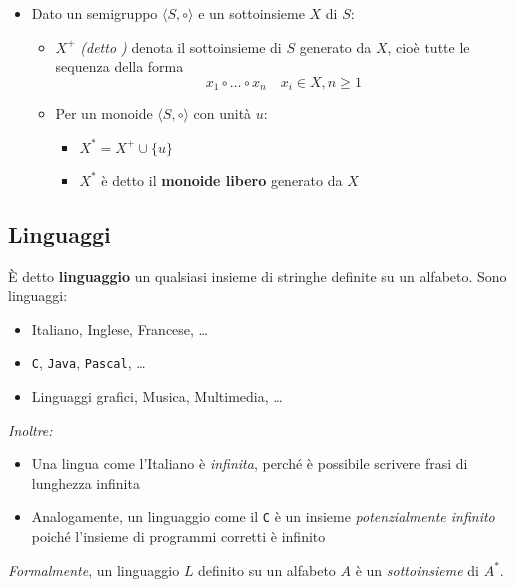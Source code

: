\documentclass[italian, 10pt]{article}
\begin{document}
\begin{itemize}
  \item Dato un semigruppo \(\langle S, \circ \rangle\) e un sottoinsieme \(X\) di \(S\):
        \begin{itemize}
          \item \(X^+\) \textit{(detto )} denota il sottoinsieme di \(S\) generato da \(X\), cioè tutte le sequenza della forma
                \[ x_1 \circ \ldots \circ x_n \quad x_i \in X, n \geq 1 \]
          \item Per un monoide \(\langle S, \circ \rangle\) con unità \(u\):
                \begin{itemize}
                  \item \(X^\ast = X^+ \cup \{u\}\)
                  \item \(X^\ast\) è detto il \textbf{monoide libero} generato da \(X\)
                \end{itemize}

        \end{itemize}
\end{itemize}

\subsection{Linguaggi}

È detto \textbf{linguaggio} un qualsiasi insieme di stringhe definite su un alfabeto.
Sono linguaggi:

\begin{itemize}
  \item Italiano, Inglese, Francese, \ldots
  \item \texttt{C}, \texttt{Java}, \texttt{Pascal}, \ldots
  \item Linguaggi grafici, Musica, Multimedia, \ldots
\end{itemize}

\textit{Inoltre:}

\begin{itemize}
  \item Una lingua come l'Italiano è \textit{infinita}, perché è possibile scrivere frasi di lunghezza infinita
  \item Analogamente, un linguaggio come il \texttt{C} è un insieme \textit{potenzialmente infinito} poiché l'insieme di programmi corretti è infinito
\end{itemize}

\textit{Formalmente}, un linguaggio \(L\) definito su un alfabeto \(A\) è un \textit{sottoinsieme} di \(A^\ast\).
\end{document}
